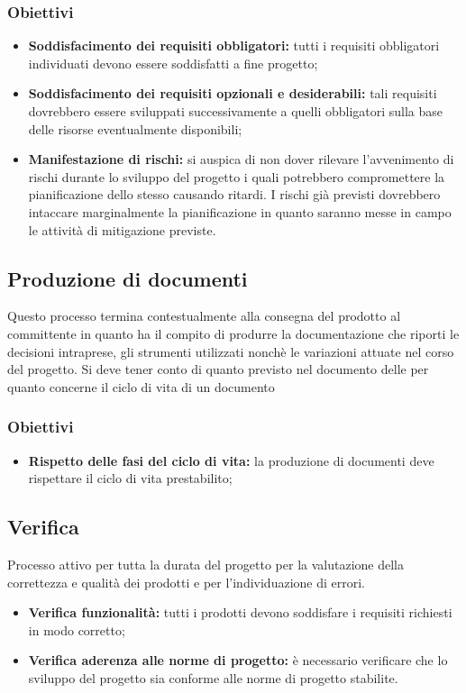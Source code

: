 \subsubsection{Obiettivi}
\begin{itemize}
    \item \textbf{Soddisfacimento dei requisiti obbligatori:} tutti i requisiti obbligatori individuati devono essere soddisfatti a fine progetto;
    \item \textbf{Soddisfacimento dei requisiti opzionali e desiderabili:} tali requisiti dovrebbero essere sviluppati successivamente a quelli obbligatori sulla base delle
          risorse eventualmente disponibili;
    \item \textbf{Manifestazione di rischi:} si auspica di non dover rilevare l'avvenimento di rischi durante lo sviluppo del progetto i quali potrebbero compromettere
          la pianificazione dello stesso causando ritardi. I rischi già previsti dovrebbero intaccare marginalmente la pianificazione in quanto saranno messe in campo le attività
          di mitigazione previste.
\end{itemize}

\subsection{Produzione di documenti}
Questo processo termina contestualmente alla consegna del prodotto al committente in quanto ha il compito di produrre la documentazione che riporti le decisioni intraprese,
gli strumenti utilizzati nonchè le variazioni attuate nel corso del progetto. Si deve tener conto di quanto previsto nel documento delle  per quanto
concerne il ciclo di vita di un documento

\subsubsection{Obiettivi}
\begin{itemize}
    \item \textbf{Rispetto delle fasi del ciclo di vita:} la produzione di documenti deve rispettare il ciclo di vita prestabilito;
\end{itemize}


\subsection{Verifica}
Processo attivo per tutta la durata del progetto per la valutazione della correttezza e qualità dei prodotti e per l'individuazione di errori.
\begin{itemize}
    \item  \textbf{Verifica funzionalità:} tutti i prodotti devono soddisfare i requisiti richiesti in modo corretto;
    \item \textbf{Verifica aderenza alle norme di progetto:} è necessario verificare che lo sviluppo del progetto sia conforme alle norme di progetto stabilite.
\end{itemize}

